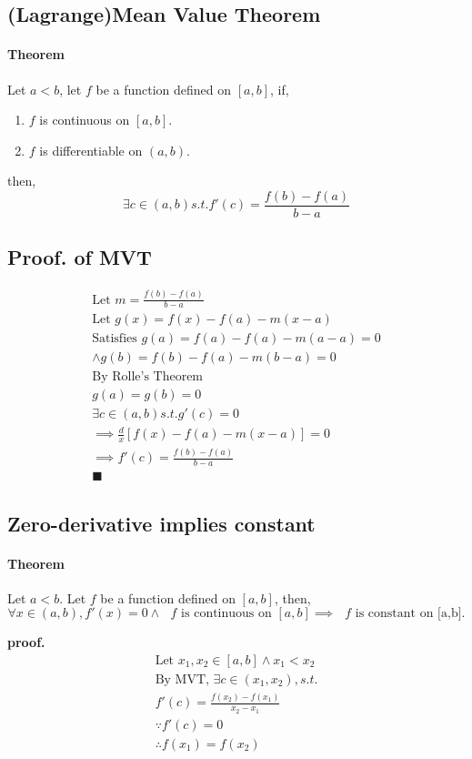 \documentclass{article}
\begin{document}
	\subsection{(Lagrange)Mean Value Theorem}
	\paragraph{Theorem} Let $a < b$, let $f$ be a function defined on $[a,b]$, if,
	\begin{enumerate}
		\item $f$ is continuous on $[a,b]$.
		\item $f$ is differentiable on $(a,b)$.
	\end{enumerate}
	then, 
	\[
	\exists c \in (a,b) s.t. f'(c) = \frac{f(b) - f(a)}{b - a}
	\]
	\subsection{Proof. of MVT}
	\begin{align*}
		\text{Let } m = \frac{f(b) - f(a)}{b - a} \\
		\text{Let } g(x) = f(x) - f(a) - m(x-a) \\
		\text{Satisfies } g(a) = f(a) - f(a) - m(a - a) = 0 \\
		\land g(b) = f(b) - f(a) - m(b-a) = 0 \\
		\text{By Rolle's Theorem} \\
		g(a) = g(b) = 0 \\
		\exists c \in (a,b) s.t. g'(c) = 0 \\
		\implies \frac{d}{x}[f(x) - f(a) - m(x-a)] = 0 \\
		\implies f'(c) = \frac{f(b) - f(a)}{b - a} \\
		\blacksquare
	\end{align*}
	\subsection{Zero-derivative implies constant}
	\paragraph{Theorem} Let $a < b$. Let $f$ be a function defined on $[a,b]$, then,
	\[
	\forall x \in (a,b), f'(x) = 0 \land \text{ $f$ is continuous on }[a,b] \implies \text{ $f$ is constant on [a,b].}
	\]
	
	\textbf{proof.}
	\begin{align*}
		\text{Let }x_1, x_2 \in [a,b] \land x_1 < x_2 \\
		\text{By MVT, }\exists c \in (x_1, x_2), s.t. \\
		f'(c) = \frac{f(x_2) - f(x_1)}{x_2 - x_1} \\
		\because f'(c) = 0 \\
		\therefore f(x_1) = f(x_2) \\	
	\end{align*}
\end{document}
